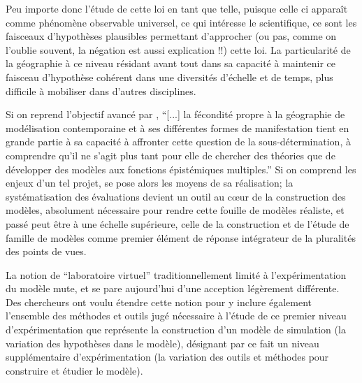 Peu importe donc l'étude de cette loi en tant que telle, puisque celle ci apparaît comme phénomène observable universel, ce qui intéresse le scientifique, ce sont les faisceaux d'hypothèses plausibles permettant d'approcher (ou pas, comme on l'oublie souvent, la négation est aussi explication !!) cette loi. La particularité de la géographie à ce niveau résidant avant tout dans sa capacité à maintenir ce faisceau d'hypothèse cohérent dans une diversités d'échelle et de temps, plus difficile à mobiliser dans d'autres disciplines.

Si on reprend l'objectif avancé par \autocite{Varenne2014}, \enquote{[...] la fécondité propre à la géographie de modélisation contemporaine et à ses différentes formes de manifestation tient en grande partie à sa capacité à affronter cette question de la sous-détermination, à comprendre qu’il ne s’agit plus tant pour elle de chercher des théories que de développer des modèles aux fonctions épistémiques multiples.} Si on comprend les enjeux d'un tel projet, se pose alors les moyens de sa réalisation; la systématisation des évaluations devient un outil au cœur de la construction des modèles, absolument nécessaire pour rendre cette fouille de modèles réaliste, et passé peut être à une échelle supérieure, celle de la construction et de l'étude de famille de modèles comme premier élément de réponse intégrateur de la pluralités des points de vues.

La notion de \enquote{laboratoire virtuel} traditionnellement limité à l'expérimentation du modèle mute, et se pare aujourd'hui d'une acception légèrement différente. Des chercheurs \autocite{Schmitt2014} \autocite{Amblard2003} ont voulu étendre cette notion pour y inclure également l'ensemble des méthodes et outils jugé nécessaire à l'étude de ce premier niveau d'expérimentation que représente la construction d'un modèle de simulation (la variation des hypothèses dans le modèle), désignant par ce fait un niveau supplémentaire d’expérimentation (la variation des outils et méthodes pour construire et étudier le modèle).



